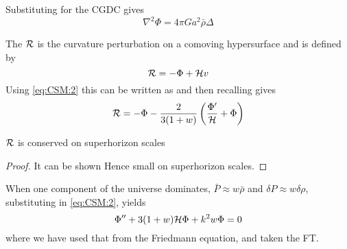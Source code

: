 \documentclass{article}
\begin{document}
Substituting for the CGDC gives 
\begin{equation}\label{eq:CSM:8}
\nabla^2 \Phi = 4\pi G a^2 \bar{\rho} \Delta
\end{equation}

\begin{definition}
The  $\mathcal{R}$ is the curvature perturbation on a comoving hypersurface and is defined by 
\[
\mathcal{R} = -\Phi + \mathcal{H}v
\]
Using \ref{eq:CSM:2} this can be written as 
and then recalling 
gives 
\begin{equation}\label{eq:CSM:6}
\mathcal{R} = -\Phi - \frac{2}{3(1+w)} \left( \frac{\Phi^\prime}{\mathcal{H}} + \Phi \right)
\end{equation}
\end{definition}

\begin{prop}
$\mathcal{R}$ is conserved on superhorizon scales
\end{prop}
\begin{proof}
It can be shown 
Hence 
small on superhorizon scales. 
\end{proof}

When one component of the universe dominates, $\bar{P} \approx w \bar{\rho} $ and $\delta P \approx w \delta \rho$, substituting in \ref{eq:CSM:2}, yields 
\begin{equation}\label{eq:CSM:7}
\Phi^{\prime \prime} + 3(1+w) \mathcal{H} \Phi + k^2 w \Phi = 0
\end{equation}
where we have used that 
from the Friedmann equation, and taken the FT. 

\end{document}
